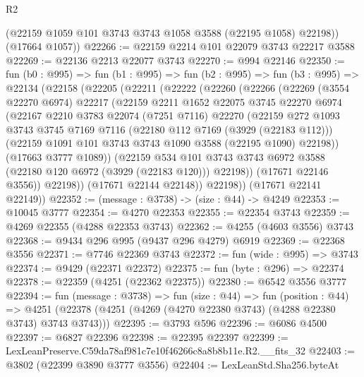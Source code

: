 \begin{lexlean}{R2}
\begin{coremodule}
        (@22159 @1059 @101 @3743 @3743 @1058 @3588 (@22195 @1058) @22198))
      (@17664 @1057))
@22266 := @22159 @2214 @101 @22079 @3743 @22217 @3588
@22269 := @22136 @2213 @22077 @3743
@22270 := @994 @22146
@22350 := fun (b0 : @995) =>
  fun (b1 : @995) =>
  fun (b2 : @995) =>
  fun (b3 : @995) =>
  @22134
    (@22158
      (@22205
        (@22211
          (@22222
            (@22260
              (@22266
                (@22269
                  (@3554 @22270 @6974)
                  @22217
                  (@22159
                    @2211
                    @1652
                    @22075
                    @3745
                    @22270
                    @6974
                    (@22167
                      @2210
                      @3783
                      @22074
                      (@7251 @7116)
                      @22270
                      (@22159
                        @272
                        @1093
                        @3743
                        @3745
                        @7169
                        @7116
                        (@22180 @112 @7169 (@3929 (@22183 @112)))
                        (@22159 @1091 @101 @3743 @3743 @1090 @3588 (@22195 @1090) @22198))
                      (@17663 @3777 @1089))
                    (@22159
                      @534
                      @101
                      @3743
                      @3743
                      @6972
                      @3588
                      (@22180 @120 @6972 (@3929 (@22183 @120)))
                      @22198))
                  (@17671 @22146 @3556))
                @22198))
            (@17671 @22144 @22148))
          @22198))
      (@17671 @22141 @22149))
@22352 := (message : @3738) -> (size : @44) -> @4249
@22353 := @10045 @3777
@22354 := @4270 @22353
@22355 := @22354 @3743
@22359 := @4269 @22355 (@4288 @22353 @3743)
@22362 := @4255 (@4603 @3556) @3743
@22368 := @9434 @296 @995 (@9437 @296 @4279) @6919
@22369 := @22368 @3556
@22371 := @7746 @22369 @3743
@22372 := fun (wide : @995) => @3743
@22374 := @9429 (@22371 @22372)
@22375 := fun (byte : @296) => @22374
@22378 := @22359 (@4251 (@22362 @22375))
@22380 := @6542 @3556 @3777
@22394 := fun (message : @3738) =>
  fun (size : @44) =>
  fun (position : @44) =>
  @4251 (@22378 (@4251 (@4269 (@4270 @22380 @3743) (@4288 @22380 @3743) @3743 @3743)))
@22395 := @3793 @596
@22396 := @6086 @4500
@22397 := @6827 @22396
@22398 := @22395 @22397
@22399 := LexLeanPreserve.C59da78af981c7e10f46266c8a8b8b11e.R2.__fits_32
@22403 := @3802 (@22399 @3890 @3777 @3556)
@22404 := LexLeanStd.Sha256.byteAt

\end{coremodule}
\end{lexlean}
